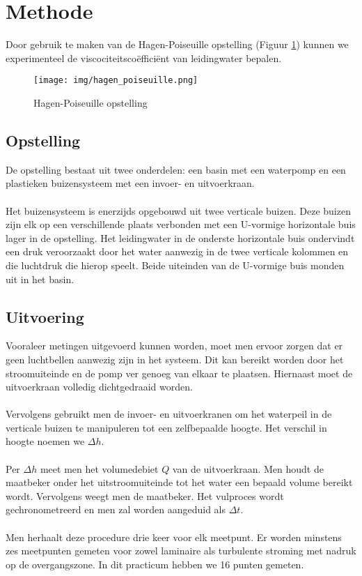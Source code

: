 \section{Methode}

Door gebruik te maken van de Hagen-Poiseuille opstelling (Figuur \ref{fig:hagen-pois}) 
kunnen we experimenteel de viscociteitsco\"effici\"ent van leidingwater bepalen. \\

\begin{figure}[h]
    \centering
    \caption{Hagen-Poiseuille opstelling}
    \texttt{[image: img/hagen\_poiseuille.png]}
    \label{fig:hagen-pois}
\end{figure}

\subsection{Opstelling}

De opstelling bestaat uit twee onderdelen: een basin
met een waterpomp en een plastieken buizensysteem met
een invoer- en uitvoerkraan.
\\ \\
Het buizensysteem is enerzijds opgebouwd uit twee verticale 
buizen. Deze buizen zijn elk op een verschillende plaats 
verbonden met een U-vormige horizontale buis lager in de opstelling.
Het leidingwater in de onderste horizontale buis ondervindt een 
druk veroorzaakt door het water aanwezig in de twee verticale
kolommen en die luchtdruk die hierop speelt. Beide uiteinden van de 
U-vormige buis monden uit in het basin.

\subsection{Uitvoering}

Vooraleer metingen uitgevoerd kunnen worden, moet men ervoor zorgen 
dat er geen luchtbellen aanwezig zijn in het systeem. 
Dit kan bereikt worden door het stroomuiteinde en de pomp
ver genoeg van elkaar te plaatsen. Hiernaast moet de uitvoerkraan 
volledig dichtgedraaid worden.
\\ \\
Vervolgens gebruikt men de invoer- en uitvoerkranen om
het waterpeil in de verticale buizen te manipuleren tot
een zelfbepaalde hoogte. Het verschil in hoogte noemen we
$\Delta h$.
\\ \\
Per $\Delta h$ meet men het volumedebiet $Q$ van de
uitvoerkraan. Men houdt de maatbeker onder het uitstroomuiteinde 
tot het water een bepaald volume bereikt wordt.
Vervolgens weegt men de maatbeker. Het vulproces wordt gechronometreerd
en men zal worden aangeduid als $\Delta t$.
\\ \\
Men herhaalt deze procedure drie keer voor elk meetpunt. 
Er worden minstens zes meetpunten gemeten voor zowel laminaire
als turbulente stroming met nadruk op de overgangszone. In dit practicum
hebben we 16 punten gemeten.

